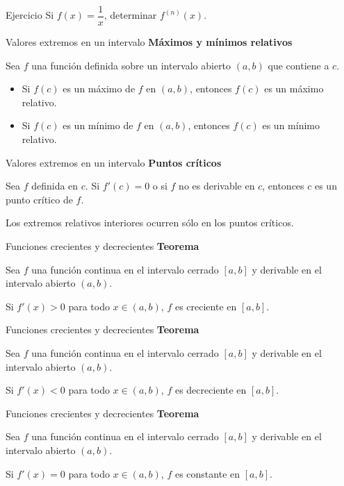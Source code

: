 \documentclass[original_version/main.tex]{subfiles}
\begin{document}
\begin{frame}{Ejercicio}
Si $f(x)=\dfrac1x$, determinar $f^{(n)}(x)$.
\end{frame}
\begin{frame}{Valores extremos en un intervalo}
\textbf{Máximos y mínimos relativos}\par\medskip
Sea $f$ una función definida sobre un intervalo abierto $(a,b)$ que contiene a $c$.
\begin{itemize}
\item Si $f(c)$ es un máximo de $f$ en $(a,b)$, entonces $f(c)$ es un máximo relativo.
\item Si $f(c)$ es un mínimo de $f$ en $(a,b)$, entonces $f(c)$ es un mínimo relativo.
\end{itemize}
\end{frame}
\begin{frame}{Valores extremos en un intervalo}
\textbf{Puntos críticos}\par\medskip
Sea $f$ definida en $c$. Si $f'(c)=0$ o si $f$ no es derivable en $c$, entonces $c$ es un punto crítico de $f$.
\medskip

Los extremos relativos interiores ocurren sólo en los puntos críticos.
\end{frame}
\begin{frame}{Funciones crecientes y decrecientes}
\textbf{Teorema}\par Sea $f$ una función continua en el intervalo cerrado $[a,b]$ y derivable en el intervalo abierto $(a,b)$.\medskip

Si $f'(x)>0$ para todo $x\in(a,b)$, $f$ es creciente en $[a,b]$.
\end{frame}
\begin{frame}{Funciones crecientes y decrecientes}
\textbf{Teorema}\par Sea $f$ una función continua en el intervalo cerrado $[a,b]$ y derivable en el intervalo abierto $(a,b)$.\medskip

Si $f'(x)<0$ para todo $x\in(a,b)$, $f$ es decreciente en $[a,b]$.
\end{frame}
\begin{frame}{Funciones crecientes y decrecientes}
\textbf{Teorema}\par Sea $f$ una función continua en el intervalo cerrado $[a,b]$ y derivable en el intervalo abierto $(a,b)$.\medskip

Si $f'(x)=0$ para todo $x\in(a,b)$, $f$ es constante en $[a,b]$.
\end{frame}
\end{document}
